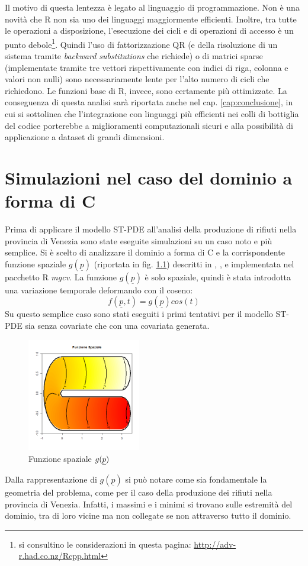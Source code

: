 \documentclass[a4paper,11pt,twoside,openright]{book}							%
\begin{document}
Il motivo di questa lentezza è legato al linguaggio di programmazione. Non è una novità che R non sia uno dei linguaggi maggiormente efficienti. Inoltre, tra tutte le operazioni a disposizione, l'esecuzione dei cicli e di operazioni di accesso è un punto debole\footnote{si consultino le considerazioni in questa pagina: \href{http://adv-r.had.co.nz/Rcpp.html}{http://adv-r.had.co.nz/Rcpp.html}}. Quindi l'uso di fattorizzazione QR (e della risoluzione di un sistema tramite \textit{backward substitutions} che richiede) o di matrici sparse (implementate tramite tre vettori rispettivamente con indici di riga, colonna e valori non nulli) sono necessariamente lente per l'alto numero di cicli che richiedono. Le funzioni base di R, invece, sono certamente più ottimizzate. La conseguenza di questa analisi sarà riportata anche nel cap. \ref{cap:conclusione}, in cui si sottolinea che l'integrazione con linguaggi più efficienti nei colli di bottiglia del codice porterebbe a miglioramenti computazionali sicuri e alla possibilità di applicazione a dataset di grandi dimensioni.

\chapter{Simulazioni nel caso del dominio a forma di C}
\label{cap:domC}
Prima di applicare il modello ST-PDE all'analisi della produzione di rifiuti nella provincia di Venezia sono state eseguite simulazioni su un caso noto e più semplice. Si è scelto di analizzare il dominio a forma di C e la corrispondente funzione spaziale $g(\underline p)$ (riportata in fig. \ref{fig:domC_fstest}) descritti in \cite{art:ramsay}, \cite{art:sangalli}, \cite{art:wood} e implementata nel pacchetto R \textit{mgcv}. La funzione $g(\underline p)$ è solo spaziale, quindi è stata introdotta una variazione temporale deformando con il coseno:
$$
f(\underline p, t)=g(\underline p)cos(t)
$$
Su questo semplice caso sono stati eseguiti i primi tentativi per il modello ST-PDE sia senza covariate che con una covariata generata.
\begin{figure}[h]
	\centering
	\includegraphics[width=0.44\textwidth]{Immagini/DomCinizio/DomC_fstest.png}   
	\caption{Funzione spaziale $g(\protect\underline{p})$}
	\label{fig:domC_fstest}
\end{figure}
\newpage
Dalla rappresentazione di $g(\underline p)$ si può notare come sia fondamentale la geometria del problema, come per il caso della produzione dei rifiuti nella provincia di Venezia. Infatti, i massimi e i minimi si trovano sulle estremità del dominio, tra di loro vicine ma non collegate se non attraverso tutto il dominio.
\end{document}
